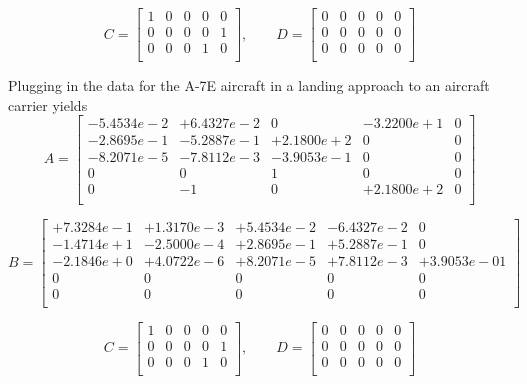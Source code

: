 \documentclass[12pt]{article}
\begin{document}
$$
C =
\begin{bmatrix}
    1 & 0 & 0 & 0 & 0\\
    0 & 0 & 0 & 0 & 1\\
    0 & 0 & 0 & 1 & 0\\
\end{bmatrix},
\qquad
D =
\begin{bmatrix}
    0 & 0 & 0 & 0 & 0\\
    0 & 0 & 0 & 0 & 0\\
    0 & 0 & 0 & 0 & 0\\
\end{bmatrix}
$$

\clearpage
\noindent Plugging in the data for the A-7E aircraft in a landing approach to an aircraft carrier yields
\begin{equation*}
A =
\begin{bmatrix}
  -5.4534e-2 & +6.4327e-2 &          0 & -3.2200e+1 &           0 \\
  -2.8695e-1 & -5.2887e-1 & +2.1800e+2 &          0 &           0 \\
  -8.2071e-5 & -7.8112e-3 & -3.9053e-1 &          0 &           0 \\
           0 &          0 &          1 &          0 &           0 \\
           0 &         -1 &          0 & +2.1800e+2 &           0 \\
\end{bmatrix}
\end{equation*}

\begin{equation*}
B =
\begin{bmatrix}
  +7.3284e-1 & +1.3170e-3 & +5.4534e-2 & -6.4327e-2 &           0 \\
  -1.4714e+1 & -2.5000e-4 & +2.8695e-1 & +5.2887e-1 &           0 \\
  -2.1846e+0 & +4.0722e-6 & +8.2071e-5 & +7.8112e-3 & +3.9053e-01 \\
           0 &          0 &          0 &          0 &           0 \\
           0 &          0 &          0 &          0 &           0 \\
\end{bmatrix}
\end{equation*}

$$
C =
\begin{bmatrix}
    1 & 0 & 0 & 0 & 0\\
    0 & 0 & 0 & 0 & 1\\
    0 & 0 & 0 & 1 & 0\\
\end{bmatrix},
\qquad
D =
\begin{bmatrix}
    0 & 0 & 0 & 0 & 0\\
    0 & 0 & 0 & 0 & 0\\
    0 & 0 & 0 & 0 & 0\\
\end{bmatrix}
$$
\end{document}
